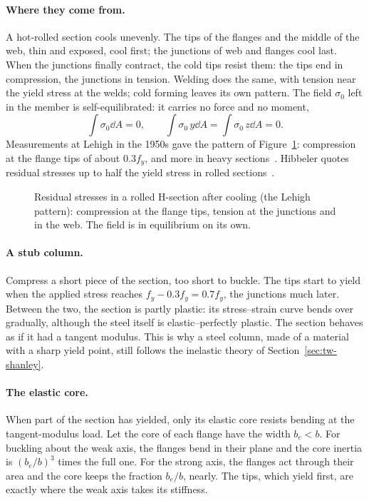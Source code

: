 \paragraph{Where they come from.}
A hot-rolled section cools unevenly. The tips of the flanges and the middle of the web, thin and
exposed, cool first; the junctions of web and flanges cool last. When the junctions finally contract,
the cold tips resist them: the tips end in compression, the junctions in tension. Welding does the
same, with tension near the yield stress at the welds; cold forming leaves its own pattern. The field
$\sigma_0$ left in the member is self-equilibrated: it carries no force and no moment,
\[
  \int\sigma_0\dd A = 0 ,
  \qquad
  \int\sigma_0\,y\dd A = \int\sigma_0\,z\dd A = 0 .
\]
Measurements at Lehigh in the 1950s
gave the pattern of Figure~\ref{fig:tw-residual}: compression at the flange tips of about $0.3f_y$, and
more in heavy sections~\cite{tw-huber1954}. Hibbeler quotes residual stresses up to half the yield
stress in rolled sections~\cite[Section~13.6]{tw-hibbeler2014}.

\begin{figure}[ht]
  \centering
  
  \caption{Residual stresses in a rolled H-section after cooling (the Lehigh pattern): compression at the
    flange tips, tension at the junctions and in the web. The field is in equilibrium on its own.}
  \label{fig:tw-residual}
\end{figure}

\paragraph{A stub column.}
Compress a short piece of the section, too short to buckle. The tips start to yield when the applied
stress reaches $f_y - 0.3f_y = 0.7f_y$, the junctions much later. Between the two, the section is partly
plastic: its stress--strain curve bends over gradually, although the steel itself is elastic--perfectly
plastic. The section behaves as if it had a tangent modulus. This is why a steel column, made of a material
with a sharp yield point, still follows the inelastic theory of Section~\ref{sec:tw-shanley}.

\paragraph{The elastic core.}
When part of the section has yielded, only its elastic core resists bending at the tangent-modulus load.
Let the core of each flange have the width $b_e < b$. For buckling about the weak axis, the flanges bend
in their plane and the core inertia is $(b_e/b)^3$ times the full one. For the strong axis, the flanges act
through their area and the core keeps the fraction $b_e/b$, nearly. The tips, which yield first, are exactly
where the weak axis takes its stiffness.

